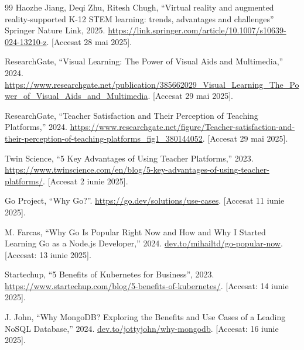 \documentclass{thesis.cs.pub.ro}
\begin{document}
\begin{thebibliography}{99}
\label{bib:9}
Haozhe Jiang, Deqi Zhu, Ritesh Chugh, “Virtual reality and augmented reality-supported K-12 STEM learning: trends, advantages and challenges”
Springer Nature Link, 2025. 
\href{https://link.springer.com/article/10.1007/s10639-024-13210-z}
{https://link.springer.com/article/10.1007/s10639-024-13210-z}. [Accesat 28 mai 2025].

\label{bib:10}
ResearchGate, “Visual Learning: The Power of Visual Aids and Multimedia,” 2024. 
\href{https://www.researchgate.net/publication/385662029_Visual_Learning_The_Power_of_Visual_Aids_and_Multimedia}{https://www.researchgate.net/publication/385662029_Visual_Learning_The_Power_of_Visual_Aids_and_Multimedia}. [Accesat 29 mai 2025].

\label{bib:11}
ResearchGate, “Teacher Satisfaction and Their Perception of Teaching Platforms,” 2024.
\href{https://www.researchgate.net/figure/Teacher-satisfaction-and-their-perception-of-teaching-platforms_fig1_380144052}{https://www.researchgate.net/figure/Teacher-satisfaction-and-their-perception-of-teaching-platforms_fig1_380144052}. [Accesat 29 mai 2025].

\label{bib:12}
Twin Science, “5 Key Advantages of Using Teacher Platforms,” 2023. \href{https://www.twinscience.com/en/blog/5-key-advantages-of-using-teacher-platforms/}{https://www.twinscience.com/en/blog/5-key-advantages-of-using-teacher-platforms/}. [Accesat 2 iunie 2025].

\label{bib:gousecases}
Go Project, “Why Go?”. 
\href{https://go.dev/solutions/use-cases}{https://go.dev/solutions/use-cases}. [Accesat 11 iunie 2025].

\label{bib:goDev}
M. Farcas, “Why Go Is Popular Right Now and How and Why I Started Learning Go as a Node.js Developer,” 2024.
\href{https://dev.to/mihailtd/why-go-is-popular-right-now-and-how-and-why-i-started-learning-go-as-a-nodejs-developer-2jcg}{dev.to/mihailtd/go-popular-now}. 
[Accesat: 13 iunie 2025].

 \label{bib:k8sBenefits}
Startechup, “5 Benefits of Kubernetes for Business”, 2023. \href{https://www.startechup.com/blog/5-benefits-of-kubernetes/}
{https://www.startechup.com/blog/5-benefits-of-kubernetes/}.
[Accesat: 14 iunie 2025].

\label{bib:mongoDevTo}
J. John, “Why MongoDB? Exploring the Benefits and Use Cases of a Leading NoSQL Database,” 2024.
\href{https://dev.to/jottyjohn/why-mongodb-exploring-the-benefits-and-use-cases-of-a-leading-nosql-database-2ilk}{dev.to/jottyjohn/why-mongodb}. 
[Accesat: 16 iunie 2025].


\end{thebibliography}
\end{document}
